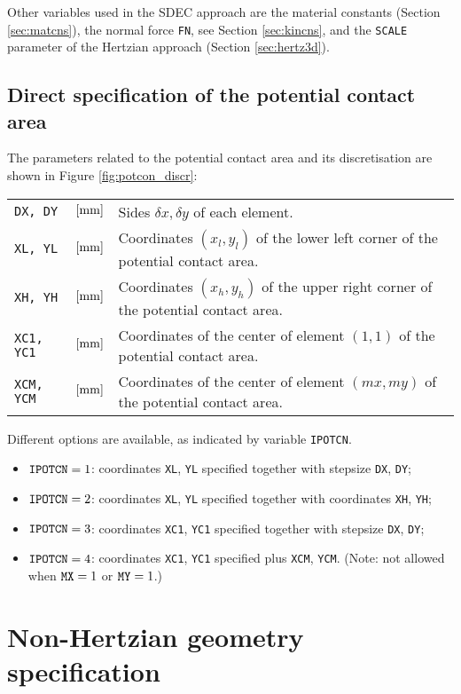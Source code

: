 \documentclass[12pt]{report}
\newenvironment{inputvars}{\vspace{0.4\baselineskip}%

\begin{tabular}{>{\raggedright}p{22mm}p{19mm}p{113mm}}}{
\end{tabular}

}
\newcommand{\inpvar}[3]{{\small\tt #1} & $#2$ & #3 \\[1ex]}
\begin{document}
Other variables used in the SDEC approach are the material constants
(Section \ref{sec:matcns}), the normal force {\tt FN}, see Section
\ref{sec:kincns}, and the {\tt SCALE} parameter of the Hertzian approach
(Section \ref{sec:hertz3d}).

\subsection{Direct specification of the potential contact area}
\label{sec:nonhzvar}

The parameters related to the potential contact area and its discretisation
are shown in Figure \ref{fig:potcon_discr}:
\begin{inputvars}
\inpvar{DX, DY}{\bunit{mm}}{Sides $\delta x,\delta y$ of each element.}
\inpvar{XL, YL}{\bunit{mm}}{Coordinates $(x_l,y_l)$ of the lower left corner of
        the potential contact area.}
\inpvar{XH, YH}{\bunit{mm}}{Coordinates $(x_h,y_h)$ of the upper right corner of
        the potential contact area.}
\inpvar{XC1, YC1}{\bunit{mm}}{Coordinates of the center of element $(1,1)$
        of the potential contact area.}
\inpvar{XCM, YCM}{\bunit{mm}}{Coordinates of the center of element $(mx,my)$
        of the potential contact area.}
\end{inputvars}
Different options are available, as indicated by variable {\tt IPOTCN}.
\begin{itemize}
\item ${\tt IPOTCN}=1$: coordinates {\tt XL}, {\tt YL} specified together
        with stepsize {\tt DX}, {\tt DY};
\item ${\tt IPOTCN}=2$: coordinates {\tt XL}, {\tt YL} specified together with
        coordinates {\tt XH}, {\tt YH};
\item ${\tt IPOTCN}=3$: coordinates {\tt XC1}, {\tt YC1} specified together
        with stepsize {\tt DX}, {\tt DY};
\item ${\tt IPOTCN}=4$: coordinates {\tt XC1}, {\tt YC1} specified plus
        {\tt XCM}, {\tt YCM}. (Note: not allowed when ${\tt MX}=1$ or ${\tt
        MY}=1$.)
\end{itemize}

\section{Non-Hertzian geometry specification}
\label{sec:ibase}
\end{document}
